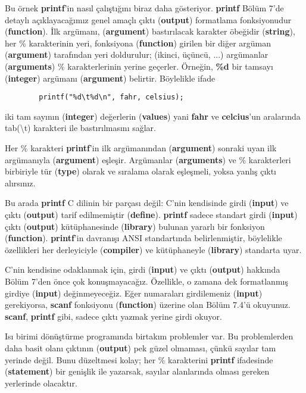\documentclass[a4paper,12pt,oneside]{book}
\begin{document}
\par Bu örnek \textbf{printf}'in nasıl çalıştığını biraz daha gösteriyor. \textbf{printf} Bölüm 7'de detaylı açıklayacağımız genel amaçlı çıktı (\textbf{output}) formatlama fonksiyonudur (\textbf{function}). İlk argümanı, (\textbf{argument}) bastırılacak karakter öbeğidir (\textbf{string}), her \% karakterinin yeri, fonksiyona (\textbf{function}) girilen bir diğer argüman (\textbf{argument}) tarafından yeri doldurulur; (ikinci, üçüncü, ...) argümanlar (\textbf{arguments}) \% karakterlerinin yerine geçerler. Örneğin, \textbf{\%d} bir tamsayı (\textbf{integer}) argümanı (\textbf{argument}) belirtir. Böylelikle ifade
\begin{lstlisting}
        printf("%d\t%d\n", fahr, celsius);
\end{lstlisting}
iki tam sayının (\textbf{integer}) değerlerin (\textbf{values}) yani \textbf{fahr} ve \textbf{celcius}'un aralarında tab(\textbackslash t) karakteri ile bastırılmasını sağlar.
\par Her \% karakteri \textbf{printf}'in ilk argümanından (\textbf{argument}) sonraki uyan ilk argümanıyla (\textbf{argument}) eşleşir. Argümanlar (\textbf{arguments}) ve \% karakterleri birbiriyle tür (\textbf{type}) olarak ve sıralama olarak eşleşmeli, yoksa yanlış çıktı alırsınız.
\par Bu arada \textbf{printf} C dilinin bir parçası değil: C'nin kendisinde girdi (\textbf{input}) ve çıktı (\textbf{output}) tarif edilmemiştir (\textbf{define}). \textbf{printf} sadece standart girdi (\textbf{input}) çıktı (\textbf{output}) kütüphanesinde (\textbf{library}) bulunan yararlı bir fonksiyon (\textbf{function}). \textbf{printf}'in davranışı ANSI standartında belirlenmiştir, böylelikle özellikleri her derleyiciyle (\textbf{compiler}) ve kütüphaneyle (\textbf{library}) standarta uyar.
\par C'nin kendisine odaklanmak için, girdi (\textbf{input}) ve çıktı (\textbf{output}) hakkında Bölüm 7'den önce çok konuşmayacağız. Özellikle, o zamana dek formatlanmış girdiye (\textbf{input}) değinmeyeceğiz. Eğer numaraları girdilemeniz (\textbf{input}) gerekiyorsa, \textbf{scanf} fonksiyonu (\textbf{function}) üzerine olan Bölüm 7.4'ü okuyunuz. \textbf{scanf}, \textbf{printf} gibi, sadece çıktı yazmak yerine girdi okuyor. \pagebreak
\par Isı birimi dönüştürme programında birtakım problemler var. Bu problemlerden daha basit olanı çıktının (\textbf{output}) pek güzel olmaması, çünkü sayılar tam yerinde değil. Bunu düzeltmesi kolay; her \% karakterini \textbf{printf} ifadesinde (\textbf{statement}) bir genişlik ile yazarsak, sayılar alanlarında olması gereken yerlerinde olacaktır.
\end{document}
